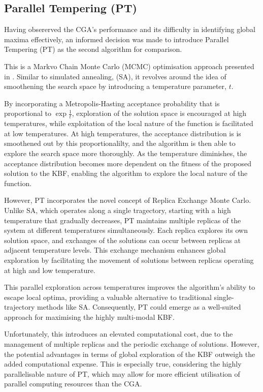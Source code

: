 \documentclass[10pt]{article}
\begin{document}
\begin{multicols}{2}

\section{Parallel Tempering (PT)}
\label{sec:PT}

Having obsererved the CGA's performance and its difficulty in identifying global maxima effectively, an informed decision was made to introduce Parallel Tempering (PT) as the second algorithm for comparison.

This is a Markvo Chain Monte Carlo (MCMC) optimisation approach presented in \cite{Earl_2005}. Similar to simulated annealing, (SA), it revolves around the idea of smoothening the search space by introducing a temperature parameter, $t$. 

By incorporating a Metropolis-Hasting acceptance probability that is proportional to $\exp\frac{1}{t}$, exploration of the solution space is encouraged at high temperatures, while exploitation of the local nature of the function is facilitated at low temperatures. At high temperatures, the acceptance distribution is is smoothened out by this proportionalilty, and the algorithm is then able to explore the search space more thoroughly. As the temperature diminishes, the acceptance distribution becomes more dependent on the fitness of the proposed solution to the KBF, enabling the algorithm to explore the local nature of the function.

However, PT incorporates the novel concept of Replica Exchange Monte Carlo. Unlike SA, which operates along a single tragectory, starting with a high temperature that gradually decreases, PT maintains multiple replicas of the system at different temperatures simultaneously. Each replica explores its own solution space, and exchanges of the solutions can occur between replicas at adjacent temperature levels. This exchange mechanism enhances global exploration by facilitating the movement of solutions between replicas operating at high and low temperature. 

This parallel exploration across temperatures improves the algorithm's ability to escape local optima, providing a valuable alternative to traditional single-trajectory methods like SA. Consequently, PT could emerge as a well-suited approach for maximising the highly multi-modal KBF.

Unfortunately, this introduces an elevated computational cost, due to the management of multiple replicas and the periodic exchange of solutions. However, the potential advantages in terms of global exploration of the KBF outweigh the added computational expense. This is especially true, considering the highly parallelisable nature of PT, which may allow for more efficient utilisation of parallel computing resources than the CGA. 


\end{multicols}
\end{document}
